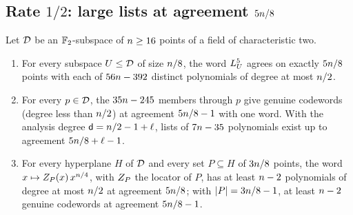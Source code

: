 \subsection{Rate \texorpdfstring{$1/2$}{1/2}: large lists at agreement \texorpdfstring{$5n/8$}{5n/8}}\label{sec:five8}

\begin{proposition}\label{prop:five8}
Let $\mathcal{D}$ be an $\mathbb{F}_2$-subspace of $n\ge16$ points of a field of characteristic two.
\begin{enumerate}[itemsep=1pt,topsep=2pt,label=\textnormal{(\alph*)}]
\item For every subspace $U\le\mathcal{D}$ of size $n/8$, the word $L_U^5$ agrees on exactly $5n/8$ points with each of $56n-392$ distinct polynomials of degree at most $n/2$.
\item For every $p\in\mathcal{D}$, the $35n-245$ members through $p$ give genuine codewords (degree less than $n/2$) at agreement $5n/8-1$ with one word. With the analysis degree $\mathsf{d}=n/2-1+\ell$, lists of $7n-35$ polynomials exist up to agreement $5n/8+\ell-1$.
\item For every hyperplane $H$ of $\mathcal{D}$ and every set $P\subseteq H$ of $3n/8$ points, the word $x\mapsto Z_P(x)\,x^{n/4}$, with $Z_P$ the locator of $P$, has at least $n-2$ polynomials of degree at most $n/2$ at agreement $5n/8$; with $|P|=3n/8-1$, at least $n-2$ genuine codewords at agreement $5n/8-1$.
\end{enumerate}
\end{proposition}

